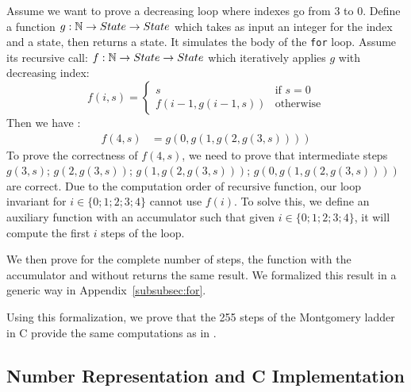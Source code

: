 Assume we want to prove a decreasing loop where indexes go from 3 to 0.
Define a function $g : \mathbb{N} \rightarrow State  \rightarrow State $ which takes as
input an integer for the index and a state, then returns a state.
It simulates the body of the \texttt{for} loop.
Assume its recursive call: $f : \mathbb{N} \rightarrow State \rightarrow State $ which
iteratively applies $g$ with decreasing index:
\begin{equation*}
  f ( i , s ) =
  \begin{cases}
  s & \text{if } s = 0 \\
  f( i - 1 , g ( i - 1  , s )) & \text{otherwise}
  \end{cases}
\end{equation*}
Then we have :
\begin{align*}
  f(4,s) &= g(0,g(1,g(2,g(3,s))))
\end{align*}
To prove the correctness of $f(4,s)$, we need to prove that intermediate steps
$g(3,s)$; $g(2,g(3,s))$; $g(1,g(2,g(3,s)))$; $g(0,g(1,g(2,g(3,s))))$ are correct.
Due to the computation order of recursive function, our loop invariant for
$i\in\{0;1;2;3;4\}$ cannot use $f(i)$.
To solve this, we define an auxiliary function with an accumulator such that
given $i\in\{0;1;2;3;4\}$, it will compute the first $i$ steps of the loop.

We then prove for the complete number of steps, the function with the accumulator
and without returns the same result.
We formalized this result in a generic way in Appendix~\ref{subsubsec:for}.

Using this formalization, we prove that the 255 steps of the Montgomery ladder
in C provide the same computations as in .




\subsection{Number Representation and C Implementation}

